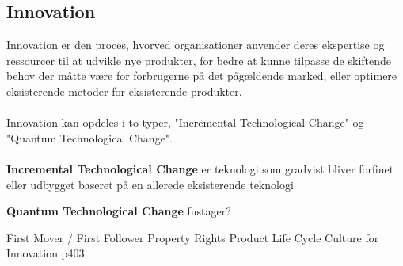 \subsection{Innovation}
Innovation er den proces, hvorved organisationer anvender deres ekspertise og
ressourcer til at udvikle nye produkter, for bedre at kunne tilpasse de skiftende
behov der måtte være for forbrugerne på det pågældende marked, eller optimere eksisterende metoder for eksisterende produkter\cite[s. 388]{jones:2013}.\\~\\
Innovation kan opdeles i to typer, "Incremental Technological Change" og "Quantum Technological Change".\\~\\
\textbf{Incremental Technological Change} er teknologi som gradvist bliver forfinet eller udbygget baseret på en allerede
eksisterende teknologi


\textbf{Quantum Technological Change}
fustager?


First Mover / First Follower
Property Rights
Product Life Cycle
Culture for Innovation p403